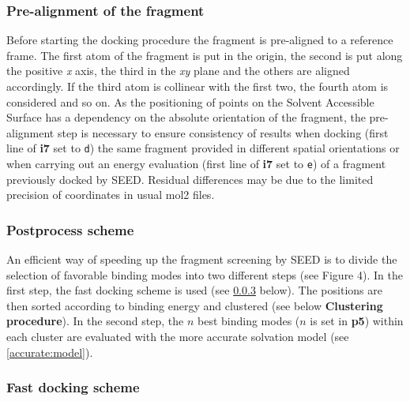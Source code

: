 \documentclass[a4paper,12pt,titlepage]{article}
\begin{document}
\subsubsection{Pre-alignment of the fragment} %
Before starting the docking procedure the fragment 
is pre-aligned to a reference frame. The first atom of the fragment is put in the origin, the second is put along the positive \textit{x} axis, the third in the \textit{xy} plane and the others are aligned accordingly. If the third atom is collinear with the first two, the fourth atom is considered and so on. As the positioning of points on the Solvent Accessible Surface has a dependency on the absolute orientation of the fragment, the pre-alignment step is necessary to ensure consistency of results when docking (first line of \textbf{i7} set to \texttt{d}) the same fragment provided in different spatial orientations or when carrying out an energy evaluation (first line of \textbf{i7} set to \texttt{e}) of a fragment previously docked by SEED. Residual differences may be due to the limited precision of coordinates in usual mol2 files.

\subsubsection{Postprocess scheme}
\label{sssec:Post}

An efficient way of speeding up the fragment screening by SEED is to divide the selection of favorable 
binding modes into two different steps (see Figure 4). In the first step, the fast docking scheme 
is used (see \ref{sssec:fastdock} below). The positions are then sorted according to binding energy 
and clustered (see below {\bf Clustering procedure}). 
In the second step, the $n$ best binding modes ($n$ is set in {\bf p5}) within each cluster are 
evaluated with the more accurate solvation model (see \ref{accurate:model}).

\subsubsection{Fast docking scheme}
\label{sssec:fastdock}
\end{document}
